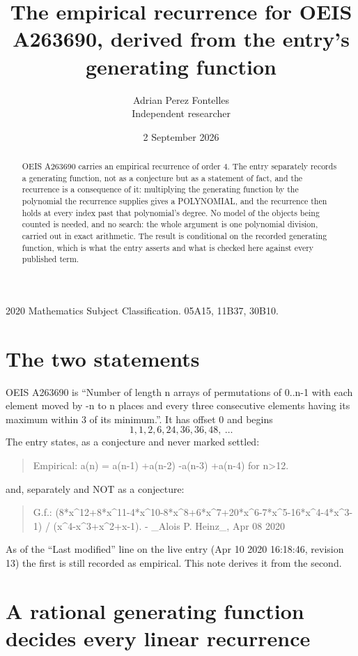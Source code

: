 \documentclass[11pt,a4paper]{article}
\title{The empirical recurrence for OEIS A263690, derived from the entry's generating function}
\author{Adrian Perez Fontelles\\ \small Independent researcher}
\date{2 September 2026}
\theoremstyle{plain}
\theoremstyle{definition}
\begin{document}
\maketitle

\begin{abstract}
OEIS A263690 carries an empirical recurrence of order $4$. The entry separately records a
generating function, not as a conjecture but as a statement of fact, and the recurrence is a
consequence of it: multiplying the generating function by the polynomial the recurrence
supplies gives a POLYNOMIAL, and the recurrence then holds at every index past that
polynomial's degree. No model of the objects being counted is needed, and no search: the
whole argument is one polynomial division, carried out in exact arithmetic. The result is
conditional on the recorded generating function, which is what the entry asserts and what is
checked here against every published term.
\end{abstract}

\noindent\small 2020 Mathematics Subject Classification. 05A15, 11B37, 30B10.\normalsize

\section{The two statements}

OEIS A263690 is ``Number of length n arrays of permutations of 0..n-1 with each element moved by -n to n places and every three consecutive elements having its maximum within 3 of its minimum.''. It has offset $0$ and begins
\[
1, 1, 2, 6, 24, 36, 36, 48,\ \dots
\]
The entry states, as a conjecture and never marked settled:
\begin{quote}
Empirical: a(n) = a(n-1) +a(n-2) -a(n-3) +a(n-4) for n>12.
\end{quote}
and, separately and NOT as a conjecture:
\begin{quote}
G.f.: (8*x\^{}12+8*x\^{}11-4*x\^{}10-8*x\^{}8+6*x\^{}7+20*x\^{}6-7*x\^{}5-16*x\^{}4-4*x\^{}3-1) / (x\^{}4-x\^{}3+x\^{}2+x-1). - \_Alois P. Heinz\_, Apr 08 2020
\end{quote}
As of the ``Last modified'' line on the live entry (Apr 10 2020 16:18:46, revision 13) the first is still
recorded as empirical. This note derives it from the second.

\section{A rational generating function decides every linear recurrence}
\end{document}
